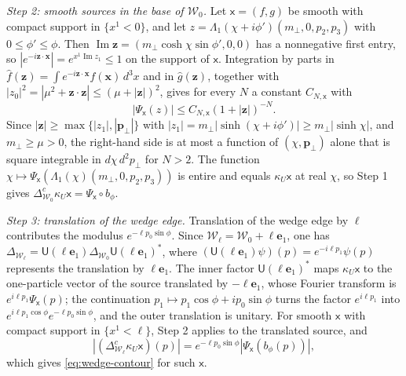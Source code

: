 \documentclass[11pt]{amsart}
\numberwithin{equation}{section}
\theoremstyle{definition}
\newcommand{\sx}{\mathsf x}
\newcommand{\bx}{\mathbf x}
\newcommand{\bp}{\mathbf p}
\newcommand{\bz}{\mathbf z}
\newcommand{\eone}{\mathbf e_1}
\newcommand{\Ima}{\operatorname{Im}}
\newcommand{\wh}[1]{\widehat{#1}}
\begin{document}
\smallskip
\emph{Step 2: smooth sources in the base of \(\mathcal W_0\).} Let
\(\sx=(f,g)\) be smooth with compact support in \(\{x^1<0\}\), and let
\(z=\Lambda_1(\chi+i\phi')(m_\perp,0,p_2,p_3)\) with \(0\le\phi'\le\phi\).
Then \(\Ima\bz=(m_\perp\cosh\chi\sin\phi',0,0)\) has a nonnegative first
entry, so \(|e^{-i\bz\cdot\bx}|=e^{x^1\Ima z_1}\le1\) on the support of
\(\sx\). Integration by parts in
\(\wh f(\bz)=\int e^{-i\bz\cdot\bx}f(\bx)\,d^3x\) and in \(\wh g(\bz)\),
together with \(|z_0|^2=|\mu^2+\bz\cdot\bz|\le(\mu+|\bz|)^2\), gives for
every \(N\) a constant \(C_{N,\sx}\) with
\[
 |\Psi_\sx(z)|\le C_{N,\sx}(1+|\bz|)^{-N}.
\]
Since \(|\bz|\ge\max\{|z_1|,|\bp_\perp|\}\) with
\(|z_1|=m_\perp\lvert\sinh(\chi+i\phi')\rvert\ge m_\perp\lvert\sinh\chi\rvert\), and \(m_\perp\ge\mu>0\), the right-hand side is at most a function of
\((\chi,\bp_\perp)\) alone that is square integrable in
\(d\chi\,d^2p_\perp\) for \(N>2\). The function
\(\chi\mapsto\Psi_\sx(\Lambda_1(\chi)(m_\perp,0,p_2,p_3))\) is entire and
equals \(\kappa_U\sx\) at real \(\chi\), so Step 1 gives
\(\Delta_{\mathcal W_0}^{c}\kappa_U\sx=\Psi_\sx\circ b_\phi\).

\smallskip
\emph{Step 3: translation of the wedge edge.}
Translation of the wedge edge by \(\ell\) contributes the modulus
\(e^{-\ell p_0\sin\phi}\). Since
\(\mathcal W_\ell=\mathcal W_0+\ell\eone\), one has
\(\Delta_{\mathcal W_\ell}=\mathsf U(\ell\eone)\Delta_{\mathcal W_0}
\mathsf U(\ell\eone)^*\), where \((\mathsf U(\ell\eone)\psi)(p)=e^{-i\ell p_1}\psi(p)\)
represents the translation by \(\ell\eone\). The inner factor
\(\mathsf U(\ell\eone)^*\) maps \(\kappa_U\sx\) to the one-particle vector of the
source translated by \(-\ell\eone\), whose Fourier transform is
\(e^{i\ell p_1}\Psi_\sx(p)\); the continuation
\(p_1\mapsto p_1\cos\phi+ip_0\sin\phi\) turns the factor \(e^{i\ell p_1}\) into
\(e^{i\ell p_1\cos\phi}e^{-\ell p_0\sin\phi}\), and the outer
translation is unitary. For smooth \(\sx\) with compact support in
\(\{x^1<\ell\}\), Step 2 applies to the translated source, and
\[
 |(\Delta_{\mathcal W_\ell}^{c}\kappa_U\sx)(p)|
 =e^{-\ell p_0\sin\phi}|\Psi_\sx(b_\phi(p))|,
\]
which gives \eqref{eq:wedge-contour} for such \(\sx\).
\end{document}
